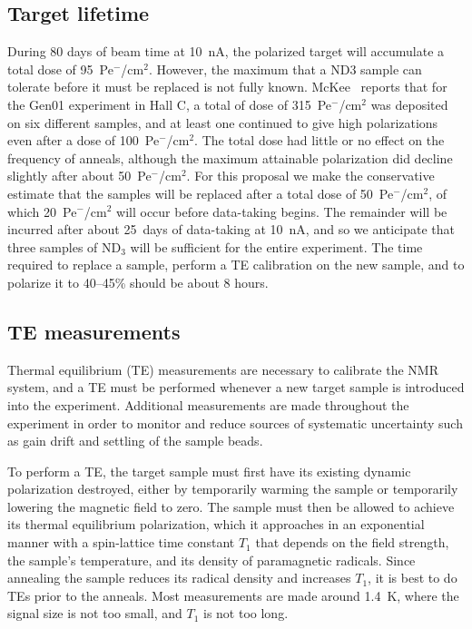\documentclass[preprint,12pt]{elsarticle}
\begin{document}
\subsection{Target lifetime}
During 80 days of beam time at 10~nA, the polarized target
will accumulate a total dose of 95~Pe$^-$/cm$^2$.
However, the maximum that a ND$3$ sample can tolerate before it must be replaced is not fully known.  
McKee~\cite{McKee2004} reports that for the Gen01 experiment in Hall C, a total of dose of
315~Pe$^{\minus}$/cm$^2$ was deposited on six different samples, and at least one continued to give high polarizations even after a dose of 100~Pe$^{\minus}$/cm$^2$.  The total dose had little or no effect on the frequency of anneals, although the maximum attainable polarization did decline slightly after about 
50~Pe$^{\minus}$/cm$^2$.   For this proposal we make the conservative estimate that the samples will be replaced after a total dose of 50~Pe$^{\minus}$/cm$^2$, of which 20~Pe$^{\minus}$/cm$^2$
will occur before data-taking begins.  The remainder will be incurred after about
25~days of data-taking at 10~nA, and so we anticipate that three samples of ND$_3$ will be sufficient 
for the entire experiment.  The time required to replace a sample, perform a TE calibration on the new sample, and to polarize it to 40--45\% should be about 8 hours.

\subsection{TE measurements}
Thermal equilibrium (TE) measurements are necessary to calibrate the NMR system,
and a TE must be performed whenever a new target sample is introduced into the experiment.  Additional
measurements are made throughout the experiment in order to monitor and reduce sources of systematic uncertainty such as gain drift and settling of the sample beads.   

To perform a TE, the target sample must first have its existing dynamic polarization destroyed, either by temporarily warming the sample or temporarily lowering the magnetic field to zero.  The sample must then be allowed to achieve its thermal equilibrium polarization, which it approaches in an exponential manner with a spin-lattice time constant $T_1$ that depends on the field strength, the sample's temperature, and its density of paramagnetic radicals. Since annealing the sample reduces its radical density and increases $T_1$, 
it is best to do TEs prior to the anneals.  Most measurements are made around 1.4~K, where the signal size is not too small, and $T_1$ is not too long.
\end{document}
